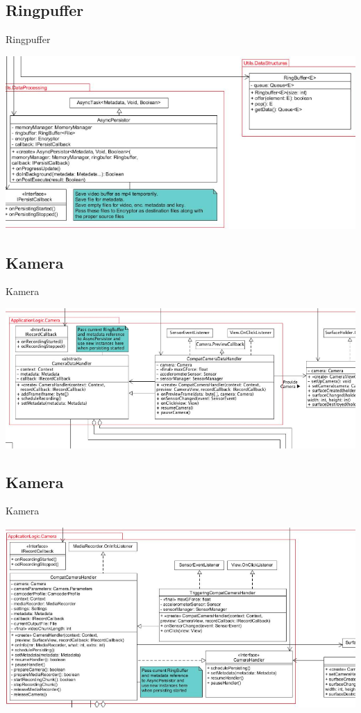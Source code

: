 \documentclass[19pt]{beamer}
\begin{document}
\subsection{Ringpuffer}
\begin{frame}{Ringpuffer}
\begin{center}
\includegraphics[scale=0.3]{resources/ringbuffer_new.png}
\end{center}
\end{frame}

\subsection{Kamera}
\begin{frame}{Kamera}
\begin{center}
\includegraphics[scale=0.33]{resources/camera_old.jpg}
\end{center}
\end{frame}
\subsection{Kamera}
\begin{frame}{Kamera}
\begin{center}
\includegraphics[scale=0.3]{resources/camera_new.png}
\end{center}
\end{frame}
\end{document}
